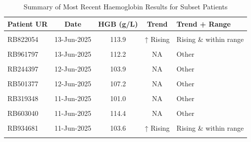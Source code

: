 \documentclass[
]{article}
\begin{document}
\begin{table}[!h]
\centering
\caption{\label{tab:Individual_patients}Summary of Most Recent Haemoglobin Results for Subset Patients}
\centering
\begin{tabular}[t]{lcccl}
\toprule
Patient UR & Date & HGB (g/L) & Trend & Trend + Range\\
\midrule
\cellcolor{gray!10}{RB481103} & \cellcolor{gray!10}{13-Jun-2025} & \cellcolor{gray!10}{103.1} & \cellcolor{gray!10}{↓ Falling} & \cellcolor{gray!10}{Falling \& within range}\\
RB822054 & 13-Jun-2025 & 113.9 & ↑ Rising & Rising \& within range\\
\cellcolor{gray!10}{RB870085} & \cellcolor{gray!10}{13-Jun-2025} & \cellcolor{gray!10}{126.8} & \cellcolor{gray!10}{↑ Rising} & \cellcolor{gray!10}{Rising \& outside range}\\
RB961797 & 13-Jun-2025 & 112.2 & NA & Other\\
\cellcolor{gray!10}{RB998806} & \cellcolor{gray!10}{13-Jun-2025} & \cellcolor{gray!10}{107.7} & \cellcolor{gray!10}{NA} & \cellcolor{gray!10}{Other}\\
\addlinespace
RB244397 & 12-Jun-2025 & 103.9 & NA & Other\\
\cellcolor{gray!10}{RB413346} & \cellcolor{gray!10}{12-Jun-2025} & \cellcolor{gray!10}{118.5} & \cellcolor{gray!10}{↑ Rising} & \cellcolor{gray!10}{Rising \& within range}\\
RB501377 & 12-Jun-2025 & 107.2 & NA & Other\\
\cellcolor{gray!10}{RB297793} & \cellcolor{gray!10}{11-Jun-2025} & \cellcolor{gray!10}{87.4} & \cellcolor{gray!10}{↓ Falling} & \cellcolor{gray!10}{Falling \& within range}\\
RB319348 & 11-Jun-2025 & 101.0 & NA & Other\\
\addlinespace
\cellcolor{gray!10}{RB390654} & \cellcolor{gray!10}{11-Jun-2025} & \cellcolor{gray!10}{110.2} & \cellcolor{gray!10}{NA} & \cellcolor{gray!10}{Other}\\
RB603040 & 11-Jun-2025 & 114.4 & NA & Other\\
\cellcolor{gray!10}{RB640405} & \cellcolor{gray!10}{11-Jun-2025} & \cellcolor{gray!10}{112.7} & \cellcolor{gray!10}{NA} & \cellcolor{gray!10}{Other}\\
RB934681 & 11-Jun-2025 & 103.6 & ↑ Rising & Rising \& within range\\
\cellcolor{gray!10}{RB957703} & \cellcolor{gray!10}{11-Jun-2025} & \cellcolor{gray!10}{123.4} & \cellcolor{gray!10}{NA} & \cellcolor{gray!10}{Other}\\

\end{tabular}
\end{table}
\end{document}

